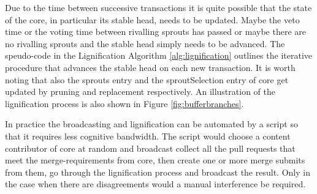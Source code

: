 \documentclass[14pt]{article}
\begin{document}
Due to the time between successive transactions it is quite possible that the state of the core, in particular its stable head, needs to be updated. Maybe the veto time or the voting time between rivalling sprouts has passed or maybe there are no rivalling sprouts and the stable head simply needs to be advanced. The speudo-code in the Lignification Algorithm \ref{alg:lignification} outlines the iterative procedure that advances the stable head on each new transaction. It is worth noting that also the sprouts entry and the sproutSelection entry of core get updated by pruning and replacement respectively.
An illustration of the lignification process is also shown in Figure \ref{fig:bufferbranches}.

In practice the broadcasting and lignification can be automated by a script so that it requires less cognitive bandwidth. The script would choose a content contributor of core at random and broadcast collect all the pull requests that meet the merge-requirements from core, then create one or more merge submits from them, go through the lignification process and broadcast the result. Only in the case when there are disagreements would a manual interference be required.
\end{document}
